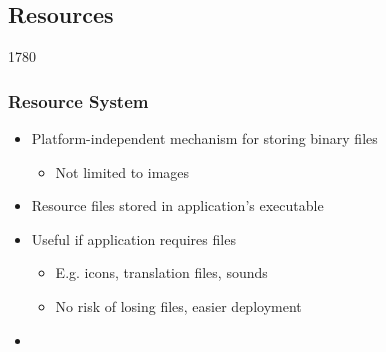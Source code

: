 %
%
%
%

\subsection{Resources}

\begin{slide}{1780}\frametitle{Resource System}
   \begin{itemize}
    \item Platform-independent mechanism for storing binary files
      \begin{itemize}
      \item Not limited to images
      \end{itemize}
    \item Resource files stored in application's executable
    \item Useful if application requires files 
      \begin{itemize}
      \item E.g. icons, translation files, sounds
      \item  No risk of losing files, easier deployment
      \end{itemize}

      \item[] 
    \end{itemize}
\end{slide}

